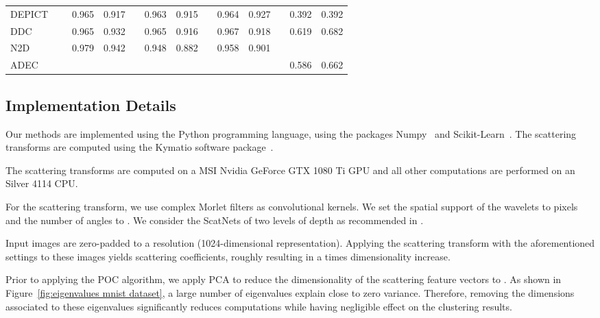 \documentclass[11pt]{article}
\theoremstyle{definition}
\newcommand{\Figure}[1]{Figure~\ref{#1}}
\begin{document}
\begin{table*}[t]
\begin{adjustbox}{width=0.99\textwidth}
\begin{tabular}{lr|llrllrllrll}
			DEPICT~\cite{Ghasedi_DEPICTDeepClusteringJointConvolutionalAutoencoderAndRelativeEntropyMinimization_2017} 	
			&& 0.965& 0.917&& 0.963& 0.915
			&& 0.964& 0.927&& 0.392& 0.392\\
			
			
			DDC~\cite{Ren_DeepDensityBasedClustering_2020}
			&& 0.965& 0.932&& 0.965& 0.916
			&& 0.967& 0.918&& 0.619& 0.682\\
			
			N2D~\cite{Mcconville_DeepClusteringManifoldAutoencodedEmbedding_2019}
			&& 0.979& 0.942&& 0.948& 0.882
			&& 0.958& 0.901&& & \\
			
			ADEC~\cite{Mrabah_AdversarialDeepEmbeddedClustering_2020}
			&& & && & 
			&& & && 0.586& 0.662\\
			
			\hline
		\end{tabular}
	\end{adjustbox}
\end{table*}


\subsection{Implementation Details}

Our methods are implemented using the Python programming language, using the packages Numpy~\cite{Harris_Numpy_2020} and Scikit-Learn~\cite{Pedregosa_ScikitLearn_201}. The scattering transforms are computed using the Kymatio software package~\cite{Andreux_Kimatio_2018}.

The scattering transforms are computed on a MSI Nvidia GeForce GTX 1080 Ti GPU and all other computations are performed on an
  Silver 4114 CPU.

For the scattering transform, we use complex Morlet filters as convolutional kernels. We set the spatial support of the wavelets to  pixels and the number of angles to . We consider the ScatNets of two levels of depth as recommended in \cite{Bruna_InvariantScattering_2012}.

Input images are zero-padded to a  resolution (1024-dimensional representation). Applying the scattering transform with the aforementioned settings to these images yields  scattering coefficients, roughly resulting in a  times dimensionality increase.



Prior to applying the POC algorithm, we apply PCA to reduce the dimensionality of the scattering feature vectors to . As shown in \Figure{fig:eigenvalues mnist dataset}, a large number of eigenvalues explain close to zero variance. Therefore, removing the dimensions associated to these eigenvalues significantly reduces computations while having negligible effect on the clustering results.
\end{document}
